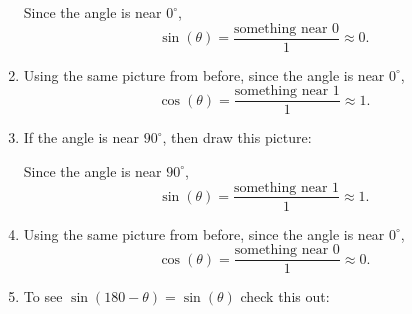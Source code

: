\documentclass[handout,noauthor,nooutcomes,12pt,hints]{ximera}
\begin{document}
\begin{question}
\begin{freeResponse}
\begin{enumerate}
\begin{center}
\begin{tikzpicture}[geometryDiagrams]
        
        
      \end{tikzpicture}
      \end{center}
      Since the angle is near $0^\circ$,
      \[
      \sin(\theta) = \frac{\text{something near $0$}}{1} \approx 0.
      \]
    \item Using the same picture from before, since the angle is near $0^\circ$,
      \[
      \cos(\theta) = \frac{\text{something near $1$}}{1} \approx 1.
      \]
    \item If the angle is near $90^\circ$, then draw this picture:
      \begin{center}
      \end{center}
      Since the angle is near $90^\circ$,
      \[
      \sin(\theta) = \frac{\text{something near $1$}}{1} \approx 1.
      \]
     \item Using the same picture from before, since the angle is near $0^\circ$,
      \[
      \cos(\theta) = \frac{\text{something near $0$}}{1} \approx 0.
      \]
    \item To see $\sin(180-\theta)=\sin(\theta)$ check this out:
      \begin{center}
\end{center}
\end{enumerate}
\end{freeResponse}
\end{question}
\end{document}
